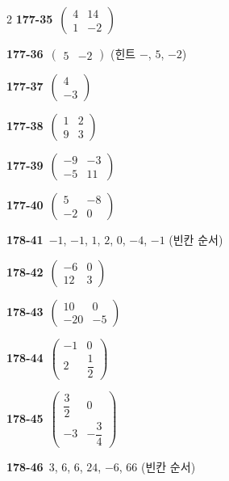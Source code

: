 \documentclass[10pt,a4paper]{article}
\begin{document}
\begin{multicols}{2}
\noindent\textbf{177-35}\ $\begin{pmatrix} 4 & 14 \\ 1 & -2 \end{pmatrix}$\par
\noindent\textbf{177-36}\ $\begin{pmatrix} 5 & -2 \end{pmatrix}$ (힌트 $-$, $5$, $-2$)\par
\noindent\textbf{177-37}\ $\begin{pmatrix} 4 \\ -3 \end{pmatrix}$\par
\noindent\textbf{177-38}\ $\begin{pmatrix} 1 & 2 \\ 9 & 3 \end{pmatrix}$\par
\noindent\textbf{177-39}\ $\begin{pmatrix} -9 & -3 \\ -5 & 11 \end{pmatrix}$\par
\noindent\textbf{177-40}\ $\begin{pmatrix} 5 & -8 \\ -2 & 0 \end{pmatrix}$\par
\noindent\textbf{178-41}\ $-1$, $-1$, $1$, $2$, $0$, $-4$, $-1$ (빈칸 순서)\par
\noindent\textbf{178-42}\ $\begin{pmatrix} -6 & 0 \\ 12 & 3 \end{pmatrix}$\par
\noindent\textbf{178-43}\ $\begin{pmatrix} 10 & 0 \\ -20 & -5 \end{pmatrix}$\par
\noindent\textbf{178-44}\ $\begin{pmatrix} -1 & 0 \\ 2 & \dfrac{1}{2} \end{pmatrix}$\par
\noindent\textbf{178-45}\ $\begin{pmatrix} \dfrac{3}{2} & 0 \\ -3 & -\dfrac{3}{4} \end{pmatrix}$\par
\noindent\textbf{178-46}\ $3$, $6$, $6$, $24$, $-6$, $66$ (빈칸 순서)\par

\end{multicols}
\end{document}
